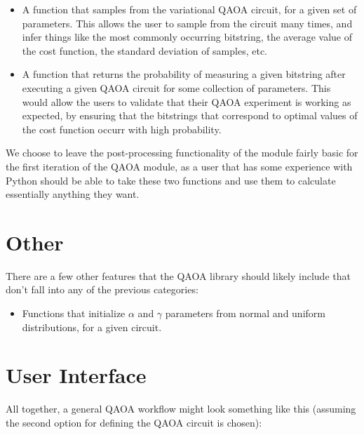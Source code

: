 \documentclass{article}
\begin{document}
\begin{itemize}
	\item A function that samples from the variational QAOA circuit, for 
		a given set of parameters. This allows the user to sample from the 
		circuit many times, and infer things like the most commonly occurring 
		bitstring, the average value of the cost function, the standard deviation 
		of samples, etc.
	\item A function that returns the probability of measuring a given bitstring after executing 
		a given QAOA circuit for some collection of parameters. This would allow the users to validate 
		that their QAOA experiment is working
		as expected, by ensuring that the bitstrings that correspond to optimal values of the cost 
		function occurr with high probability.
\end{itemize}

We choose to leave the post-processing functionality of the module fairly basic for the 
first iteration of the QAOA module, 
as a user that has some experience with Python should be able to take these two functions 
and use them to calculate essentially anything they want.

\section{Other}

There are a few other features that the QAOA library should likely include that don't fall into 
any of the previous categories:

\begin{itemize}
	\item Functions that initialize $\alpha$ and $\gamma$ parameters from normal and uniform distributions, 
		for a given circuit.
\end{itemize}

\section{User Interface}

All together, a general QAOA workflow might look something like this (assuming the second 
option for defining the QAOA circuit is chosen):
\end{document}
